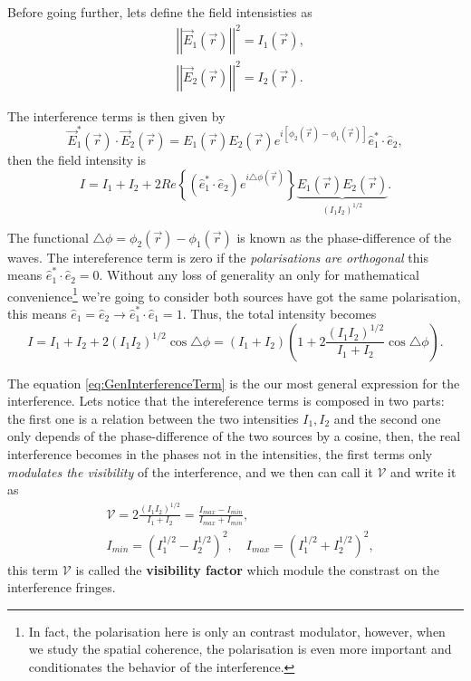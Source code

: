     Before going further, lets define the field intensisties as
    \begin{align}
        & \left|\left|\vec{E}_1(\vec{r}) \right|\right|^2 = I_1(\vec{r}),\\
        & \left|\left|\vec{E}_2(\vec{r}) \right|\right|^2 = I_2(\vec{r}).
    \end{align}

    The interference terms is then given by
    \begin{equation}
        \vec{E}_1^*(\vec{r})\cdot \vec{E}_2(\vec{r}) = E_1(\vec{r})E_2(\vec{r})e^{i \left[ \phi_2(\vec{r}) - \phi_1(\vec{r})\right]}\hat{e}_1^*\cdot\hat{e}_2,
    \end{equation}
    then the field intensity is
    \begin{equation}
        I = I_1 + I_2 + 2Re\left\{\left(\hat{e}^*_1\cdot \hat{e}_2\right)e^{i\triangle\phi (\vec{r})} \right\} \underbrace{E_1(\vec{r})E_2(\vec{r})}_{\left(I_1I_2\right)^{1/2}}.
    \end{equation}

    The functional $\triangle\phi = \phi_2(\vec{r}) - \phi_1(\vec{r})$ is known as the phase-difference of the waves. The intereference term is zero if the \emph{polarisations are orthogonal} this means $\hat{e}^*_1\cdot\hat{e}_2 = 0$. Without any loss of generality an only for mathematical convenience\footnote{In fact, the polarisation here is only an contrast modulator, however, when we study the spatial coherence, the polarisation is even more important and conditionates the behavior of the interference.} we're going to consider both sources have got the same polarisation, this means $\hat{e}_1 = \hat{e}_2 \rightarrow \hat{e}_1^* \cdot \hat{e}_1 = 1$. Thus, the total intensity becomes
    \begin{equation}\label{eq:GenInterferenceTerm}
        I = I_1 + I_2 + 2\left(I_1 I_2\right)^{1/2} \cos\triangle\phi = \left(I_1 + I_2\right)\left(1 + 2\frac{\left(I_1I_2\right)^{1/2}}{I_1+I_2}\cos\triangle\phi\right).
    \end{equation}

    The equation \ref{eq:GenInterferenceTerm} is the our most general expression for the interference. Lets notice that the intereference terms is composed in two parts: the first one is a relation between the two intensities $I_1,I_2$ and the second one only depends of the phase-difference of the two sources by a cosine, then, the real interference becomes in the phases not in the intensities, the first terms only \emph{modulates the visibility} of the interference, and we then can call it $\mathcal{V}$ and write it as
    \begin{align}
        & \mathcal{V} = 2 \frac{\left(I_1 I_2\right)^{1/2}}{I_1+ I_2} = \frac{I_{max} - I_{min}}{I_{max} + I_{min}},\\
        & I_{min} = \left(I_1^{1/2} - I_2^{1/2} \right)^2, \quad I_{max} = \left(I_1^{1/2} + I_2^{1/2} \right)^2,
    \end{align}
    this term $\mathcal{V}$ is called the \textbf{visibility factor} which module the constrast on the interference fringes. 
    

